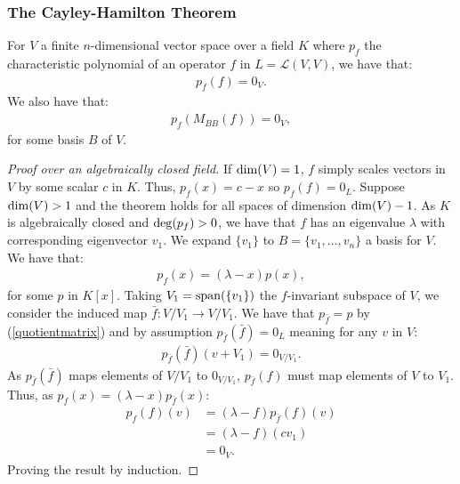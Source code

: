\subsubsection{The Cayley-Hamilton Theorem}

For $V$ a finite $n$-dimensional vector space over a field $K$ where 
$p_f$ the characteristic polynomial of an operator $f$ in $L = \mathcal{L}(V, V)$, 
we have that: \begin{gather*}
  p_f(f) = 0_V.
\end{gather*} We also have that: \begin{gather*}
  p_f(M_{BB}(f)) = 0_V,
\end{gather*} for some basis $B$ of $V$.
\begin{proof}[Proof over an algebraically closed field]
    If $\operatorname{dim}(V)= 1$, $f$ simply scales vectors in $V$ by some scalar $c$
    in $K$. Thus, $p_f(x) = c - x$ so $p_f(f) = 0_L$. Suppose $\operatorname{dim}(V) > 1$
    and the theorem holds for all spaces of dimension $\operatorname{dim}(V) - 1$. As
    $K$ is algebraically closed and $\operatorname{deg}(p_f) > 0$, we have that $f$
    has an eigenvalue $\lambda$ with corresponding eigenvector $v_1$.
    We expand $\{v_1\}$ to $B = \{v_1, \ldots, v_n\}$ a basis for $V$.
    We have that: \begin{gather*}
        p_f(x) = (\lambda - x)p(x),
    \end{gather*} for some $p$ in $K[x].$
    Taking $V_1 = \operatorname{span}(\{v_1\})$ the $f$-invariant subspace of $V$,
    we consider the induced map $\bar{f} : V/V_1 \to V/V_1$. 
    We have that $p_{\bar{f}} = p$ by (\ref{quotientmatrix}) 
    and by assumption $p_{\bar{f}}(\bar{f}) = 0_L$ meaning for any $v$ in $V$:
    \begin{gather*}
        p_{\bar{f}}(\bar{f})(v + V_1) = 0_{V/V_1}.
    \end{gather*} As $p_{\bar{f}}(\bar{f})$ maps elements
    of $V/V_1$ to $0_{V/V_1}$, $p_{\bar{f}}(f)$ must map elements
    of $V$ to $V_1$. 
    Thus, as $p_f(x) = (\lambda - x)p_{\bar{f}}(x)$: \begin{align*}
        p_f(f)(v) &= (\lambda - f)p_{\bar{f}}(f)(v) \\
        &= (\lambda - f)(c v_1) \tag{for some $c$ in $K$} \\
        &= 0_V.
    \end{align*} Proving the result by induction.
\end{proof}